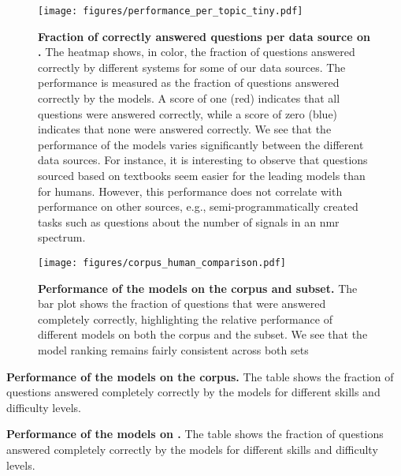 \begin{figure}[htb]
    \centering
    \texttt{[image: figures/performance\_per\_topic\_tiny.pdf]}
    \caption{\textbf{Fraction of correctly answered questions per data source on \chembenchmini.} The heatmap shows, in color, the fraction of questions answered correctly by different systems for some of our data sources. The performance is measured as the fraction of questions answered correctly by the models. A score of one (red) indicates that all questions were answered correctly, while a score of zero (blue) indicates that none were answered correctly.
        We see that the performance of the models varies significantly between the different data sources. For instance, it is interesting to observe that questions sourced based on textbooks seem easier for the leading models than for humans. However, this performance does not correlate with performance on other sources, e.g., semi-programmatically created tasks such as questions about the number of signals in an \gls{nmr} spectrum.
    }
    \label{fig:performance_per_topic_tiny}
\end{figure}


\begin{figure}[htb]
    \centering
    \texttt{[image: figures/corpus\_human\_comparison.pdf]}
    \caption{\textbf{
        Performance of the models on the \chembench corpus and \chembenchmini subset.} The bar plot shows the fraction of questions that were answered completely correctly, highlighting the relative performance of different models on both the \chembench corpus and the \chembenchmini subset.
        We see that the model ranking remains fairly consistent across both sets}  
    \label{fig:performance_corpus_and_tiny}
\end{figure}

\begin{table}
    \caption{\textbf{Performance of the models on the \chembench corpus.} The table shows the fraction of questions answered completely correctly by the models for different skills and difficulty levels.}
    \label{tab:performance_table}
\end{table}

\begin{table}
    \caption{\textbf{Performance of the models on \chembenchmini.} The table shows the fraction of questions answered completely correctly by the models for different skills and difficulty levels.}
    \label{tab:performance_table_human_subset}
\end{table}



